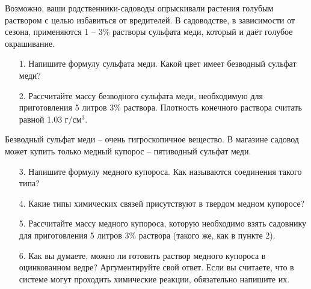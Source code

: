 Возможно, ваши родственники-садоводы опрыскивали растения голубым раствором с целью избавиться от вредителей. В садоводстве, в зависимости от сезона, применяются 1 – 3\% растворы сульфата меди, который и даёт голубое окрашивание.
\begin{enumerate}
\item[1.] Напишите формулу сульфата меди. Какой цвет имеет безводный сульфат меди? 
\item[2.] Рассчитайте массу безводного сульфата меди, необходимую для приготовления 5 литров 3\% раствора. Плотность конечного раствора считать равной 1.03 г/см$^3$.
\end{enumerate}
Безводный сульфат меди – очень гигроскопичное вещество. В магазине садовод может купить только медный купорос – пятиводный сульфат меди.
\begin{enumerate}
\item[3.] Напишите формулу медного купороса. Как называются соединения такого типа?
\item[4.] Какие типы химических связей присутствуют в твердом медном купоросе?
\item[5.] Рассчитайте массу медного купороса, которую необходимо взять садовнику для приготовления 5 литров 3\% раствора (такого же, как в пункте 2). 
\item[6.]	Как вы думаете, можно ли готовить раствор медного купороса в оцинкованном ведре? Аргументируйте свой ответ. Если вы считаете, что в системе могут проходить химические реакции, обязательно напишите их.
\end{enumerate}